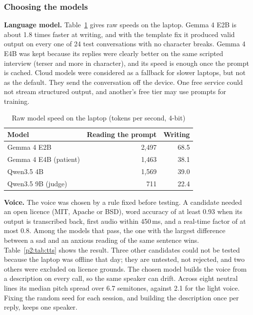 \documentclass[journal]{IEEEtran}
\begin{document}
\subsubsection{Choosing the models}
\textbf{Language model.} Table~\ref{p2:tab:bench} gives raw speeds on the laptop. Gemma 4 E2B is about 1.8 times faster at writing, and with the
template fix it produced valid output on every one of 24 test conversations with no character breaks. Gemma 4 E4B was kept because its replies
were clearly better on the same scripted interview (terser and more in character), and its speed is enough once the prompt is cached. Cloud models were considered as a fallback for slower laptops, but not as the default. They send the conversation off the device. One free service could not stream structured output, and another's free tier may use prompts for training.

\begin{table}[t]
\caption{Raw model speed on the laptop (tokens per second, 4-bit)}
\label{p2:tab:bench}
\centering
\footnotesize
\begin{tabular}{@{}lrr@{}}
\toprule
Model & Reading the prompt & Writing\\
\midrule
Gemma 4 E2B & 2,497 & 68.5\\
Gemma 4 E4B (patient) & 1,463 & 38.1\\
Qwen3.5 4B & 1,569 & 39.0\\
Qwen3.5 9B (judge) & 711 & 22.4\\
\bottomrule
\end{tabular}
\end{table}

\textbf{Voice.} The voice was chosen by a rule fixed before testing. A candidate needed an open licence (MIT, Apache or BSD), word accuracy of at least 0.93 when its output is transcribed back, first audio within 450\,ms, and a real-time factor of at most 0.8. Among the models that pass, the one with the largest difference between a sad and an anxious reading of the same sentence wins. Table~\ref{p2:tab:tts} shows the result. Three
other candidates could not be tested because the laptop was offline that day; they are untested, not rejected, and two others were excluded on
licence grounds. The chosen model builds the voice from a description on every call, so the same speaker can drift. Across eight neutral lines its median pitch spread over 6.7 semitones, against 2.1 for the light voice. Fixing the random seed for each session, and building the description
once per reply, keeps one speaker.
\end{document}
